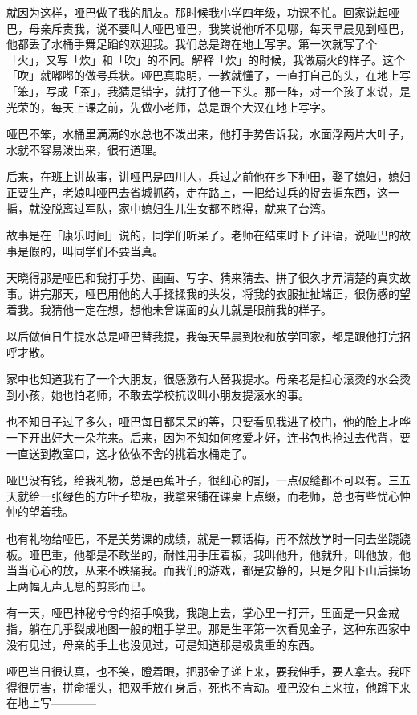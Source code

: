 \documentclass[UTF8]{ctexart}
\begin{document}
就因为这样，哑巴做了我的朋友。那时候我小学四年级，功课不忙。回家说起哑巴，母亲斥责我，说不要叫人哑巴哑巴，我笑说他听不见哪，每天早晨见到哑巴，他都丢了水桶手舞足蹈的欢迎我。我们总是蹲在地上写字。第一次就写了个「火」，又写「炊」和「吹」的不同。解释「炊」的时候，我做扇火的样子。这个「吹」就嘟嘟的做号兵状。哑巴真聪明，一教就懂了，一直打自己的头，在地上写「笨」，写成「茶」，我猜是错字，就打了他一下头。那一阵，对一个孩子来说，是光荣的，每天上课之前，先做小老师，总是跟个大汉在地上写字。

哑巴不笨，水桶里满满的水总也不泼出来，他打手势告诉我，水面浮两片大叶子，水就不容易泼出来，很有道理。

后来，在班上讲故事，讲哑巴是四川人，兵过之前他在乡下种田，娶了媳妇，媳妇正要生产，老娘叫哑巴去省城抓药，走在路上，一把给过兵的捉去掮东西，这一掮，就没脱离过军队，家中媳妇生儿生女都不晓得，就来了台湾。

故事是在「康乐时间」说的，同学们听呆了。老师在结束时下了评语，说哑巴的故事是假的，叫同学们不要当真。

天晓得那是哑巴和我打手势、画画、写字、猜来猜去、拼了很久才弄清楚的真实故事。讲完那天，哑巴用他的大手揉揉我的头发，将我的衣服扯扯端正，很伤感的望着我。我猜他一定在想，想他未曾谋面的女儿就是眼前我的样子。

以后做值日生提水总是哑巴替我提，我每天早晨到校和放学回家，都是跟他打完招呼才散。

家中也知道我有了一个大朋友，很感激有人替我提水。母亲老是担心滚烫的水会烫到小孩，她也怕老师，不敢去学校抗议叫小朋友提滚水的事。

也不知日子过了多久，哑巴每日都呆呆的等，只要看见我进了校门，他的脸上才哗一下开出好大一朵花来。后来，因为不知如何疼爱才好，连书包也抢过去代背，要一直送到教室口，这才依依不舍的挑着水桶走了。

哑巴没有钱，给我礼物，总是芭蕉叶子，很细心的割，一点破缝都不可以有。三五天就给一张绿色的方叶子垫板，我拿来铺在课桌上点缀，而老师，总也有些忧心忡忡的望着我。

也有礼物给哑巴，不是美劳课的成绩，就是一颗话梅，再不然放学时一同去坐跷跷板。哑巴重，他都是不敢坐的，耐性用手压着板，我叫他升，他就升，叫他放，他当当心心的放，从来不跌痛我。而我们的游戏，都是安静的，只是夕阳下山后操场上两幅无声无息的剪影而已。

有一天，哑巴神秘兮兮的招手唤我，我跑上去，掌心里一打开，里面是一只金戒指，躺在几乎裂成地图一般的粗手掌里。那是生平第一次看见金子，这种东西家中没有见过，母亲的手上也没见过，可是知道那是极贵重的东西。

哑巴当日很认真，也不笑，瞪着眼，把那金子递上来，要我伸手，要人拿去。我吓得很厉害，拼命摇头，把双手放在身后，死也不肯动。哑巴没有上来拉，他蹲下来在地上写————
\end{document}
